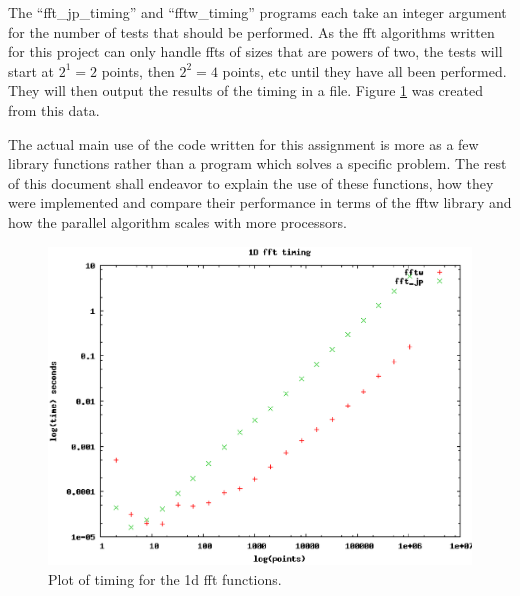 \documentclass[12pt]{article}
\begin{document}
The ``fft\_jp\_timing'' and ``fftw\_timing'' programs each take an integer argument for the number of tests that should be performed. As the
fft algorithms written for this project can only handle ffts of sizes that are powers of two, the tests will start at $2^1 = 2$ points, then $2^2=4$ points, etc
until they have all been performed. They will then output the results of the timing in a file. Figure \ref{1d_time} was created from this data.

The actual main use of the code written for this assignment is more as a few library functions rather than a program which solves a specific problem.
The rest of this document shall endeavor to explain the use of these functions, how they were implemented and compare their performance in terms
of the fftw library and how the parallel algorithm scales with more processors.


\begin{figure}
\begin{center}
\includegraphics[scale=0.5]{figures/1d_timing.eps} \small \caption{Plot of timing for the 1d fft functions.\label{1d_time}}
\end{center}
\end{figure}
\end{document}
